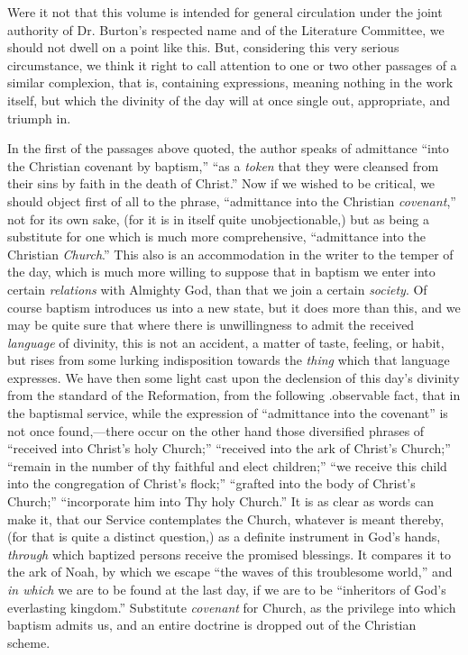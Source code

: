 Were it not
that this volume is intended for general circulation under the joint
authority of Dr. Burton's respected name and of the Literature
Committee, we should not dwell on a point like this. But, considering
this very serious circumstance, we think it right to call attention to
one or two other passages of a similar complexion, that is, containing
expressions, meaning nothing in the work itself, but which the divinity
of the day will at once single out, appropriate, and triumph in.

In the
first of the passages above quoted, the author speaks of admittance ``into the Christian covenant by baptism,''
``as a \emph{token} that
they were cleansed from their sins by faith in the death of Christ.''
Now if we wished to be critical, we should object first of all to the
phrase, ``admittance into the Christian \emph{covenant},'' not for its
own sake, (for it is in itself quite unobjectionable,) but as being a
substitute for one which is much more comprehensive, ``admittance into
the Christian \emph{Church}.'' This also is an accommodation in the
writer to the temper of the day, which is much more willing to suppose
that in baptism we enter into certain \emph{relations} with Almighty
God, than that we join a certain \emph{society}. Of course baptism
introduces us into a new state, but it does more than this, and we may
be quite sure that where there is unwillingness to admit the received \emph{language}
of divinity, this is not an accident, a matter of taste, feeling, or
habit, but rises from some lurking indisposition towards the \emph{thing}
which that language expresses. We have then some light cast upon the
declension of this day's divinity from the standard of the
Reformation, from the following .observable fact, that in the baptismal
service, while the expression of ``admittance into the covenant'' is
not once found,—there occur on the other hand those diversified
phrases of ``received into Christ's holy Church;'' ``received into
the ark of Christ's Church;'' ``remain in the number of thy faithful
and elect children;'' ``we receive this child into the congregation of
Christ's flock;'' ``grafted into the body of Christ's Church;'' ``incorporate him into Thy holy Church.'' It is as clear as words can
make it, that our Service contemplates the Church, whatever is meant
thereby, (for that is quite a distinct question,) as a definite
instrument in God's hands, \emph{through} which baptized persons
receive the promised blessings. It compares it to the ark of Noah, by
which we escape ``the waves of this troublesome world,'' and \emph{in
which} we are to be found at the last day, if we are to be ``inheritors of God's everlasting kingdom.'' Substitute \emph{covenant}
for Church, as the privilege into which baptism admits us, and an entire
doctrine is dropped out of the Christian scheme.

